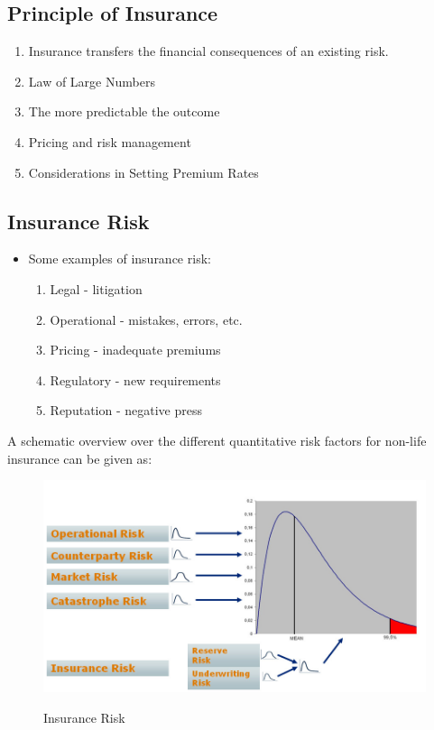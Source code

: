 \subsection{Principle of Insurance}
\begin{enumerate}
\item Insurance transfers the financial consequences of an existing risk.
\item Law of Large Numbers
\item The more predictable the outcome
\item Pricing and risk management
\item Considerations in Setting Premium Rates
\end{enumerate}

\newpage
\subsection{Insurance Risk}
\begin{itemize}
	\item Some examples of insurance risk:
	\begin{enumerate}
		\item Legal - litigation
		\item Operational - mistakes, errors, etc.
		\item Pricing - inadequate premiums
        \item Regulatory - new requirements
        \item Reputation - negative press
	\end{enumerate}
\end{itemize}
A schematic overview over the different quantitative risk factors for non-life insurance can be given as:
\begin{figure}[tbh] %
\begin{center}
	\includegraphics[width = 5in]{images/ir.png}
	\caption{Insurance Risk}\cite{grevskott_2011} %


	\label{Risk type}%
\end{center}
\end{figure}
